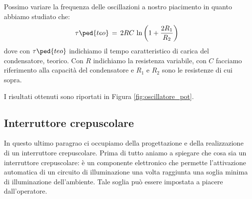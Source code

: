 Possimo variare la frequenza delle oscillazioni a nostro piacimento in quanto abbiamo studiato che:
\begin{equation}
        \tau\ped{teo}\,=\,2RC\,\ln \left(1+\frac{2R_1}{R_2}\right)   
\end{equation}
dove con $\tau\ped{teo}$ indichiamo il tempo caratteristico di carica del condensatore, teorico. Con $R$ indichiamo la resistenza variabile, con $C$ facciamo riferimento alla capacità del condensatore e $R_1$ e $R_2$ sono le resistenze di cui sopra.

I risultati ottenuti sono riportati in Figura \ref{fig:oscillatore_pot}.

\subsection*{Interruttore crepuscolare}

In questo ultimo paragrao ci occupiamo della progettazione e della realizzazione di un interruttore crepuscolare. Prima di tutto aniamo a spiegare che cosa sia un interruttore crepuscolare: è un componente elettronico che permette l'attivazione automatica di un circuito di illuminazione una volta raggiunta una soglia minima di illuminazione dell'ambiente. Tale soglia può essere impostata a piacere dall'operatore.

